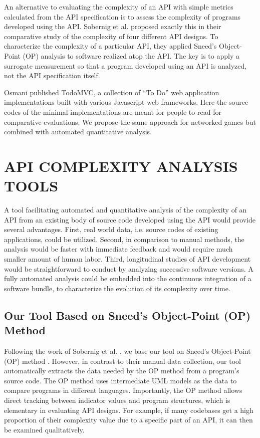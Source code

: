 \documentclass[conference]{IEEEtran}
\begin{document}
An alternative to evaluating the complexity of an API with simple
metrics calculated from the API specification is to assess the
complexity of programs developed using the API. Sobernig et
al. \cite{api-complexity-analysis} proposed exactly this in their
comparative study of the complexity of four different API designs. To
characterize the complexity of a particular API, they applied Sneed’s
\cite{Sneed} Object-Point (OP) analysis to software realized atop the
API. The key is to apply a surrogate measurement so that a program
developed using an API is analyzed, not the API specification itself.

Osmani\cite{todomvc} published TodoMVC, a collection of “To Do” web
application implementations built with various Javascript web
frameworks. Here the source codes of the minimal implementations are
meant for people to read for comparative evaluations. We propose the
same approach for networked games but combined with automated
quantitative analysis.

\section{API COMPLEXITY ANALYSIS TOOLS}

A tool facilitating automated and quantitative analysis of the
complexity of an API from an existing body of source code developed
using the API would provide several advantages. First, real world
data, i.e. source codes of existing applications, could be
utilized. Second, in comparison to manual methods, the analysis would
be faster with immediate feedback and would require much smaller
amount of human labor. Third, longitudinal studies of API development
would be straightforward to conduct by analyzing successive software
versions. A fully automated analysis could be embedded into the
continuous integration of a software bundle, to characterize the
evolution of its complexity over time.

\subsection{Our Tool Based on Sneed’s Object-Point (OP) Method}

Following the work of Sobernig et al. \cite{api-complexity-analysis},
we base our tool on Sneed’s Object-Point (OP) method \cite{Sneed}.
However, in contrast to their manual data collection, our tool
automatically extracts the data needed by the OP method from a
program’s source code. The OP method uses intermediate UML models as
the data to compare programs in different languages. Importantly, the
OP method allows direct tracking between indicator values and program
structures, which is elementary in evaluating API designs. For
example, if many codebases get a high proportion of their complexity
value due to a specific part of an API, it can then be examined
qualitatively.
\end{document}
